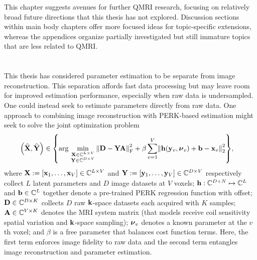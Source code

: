 
This chapter suggests avenues
for further QMRI research,
focusing on relatively broad future directions
that this thesis has not explored.
Discussion sections
within main body chapters
offer more focused ideas 
for topic-specific extensions,
whereas the appendices organize 
partially investigated but still immature topics
that are less related to QMRI.

\section{%
}%
\label{s,future,recon}

This thesis has considered parameter estimation
to be separate from image reconstruction.
This separation affords fast data processing
but may leave room for improved estimation performance,
especially when raw data is undersampled.
One could instead seek 
to estimate parameters 
directly from raw data.
One approach 
to combining image reconstruction
with PERK-based estimation
might seek to solve
the joint optimization problem
\begin{align}
	\paren{\est{\bmX},\est{\bmY}} &\in \set{%
		\argmin{%
			\substack{%
				\bmX \in \complexes{L \times V} \\
				\bmY \in \complexes{D \times V} \\
			}%
		}%
		\frob{\bmD-\bmY\bmA}^2 
			+ \beta \sum_{v=1}^V 
				\norm{\bmh\paren{\bmy_v,\bmnu_v}+\bmb-\bmx_v}^2_2
	},
	\label{eq:future,recon}
\end{align}
where 
$\bmX := \brac{\bmx_1,\dots,\bmx_V} \in \complexes{L \times V}$
and
$\bmY := \brac{\bmy_1,\dots,\bmy_V} \in \complexes{D \times V}$
respectively collect $L$ latent parameters 
and $D$ image datasets 
at $V$ voxels;
$\mathbf{h} : \mathbb{C}^{D+N} \mapsto \mathbb{C}^{L}$ 
and $\mathbf{b} \in \mathbb{C}^{L}$ 
together denote a pre-trained PERK regression function with offset;
$\mathbf{D} \in \mathbb{C}^{D \times K}$
collects $D$ raw $\mathbf{k}$-space datasets 
each acquired with $K$ samples;
$\mathbf{A} \in \mathbb{C}^{V \times K}$ 
denotes the MRI system matrix
(that models receive coil sensitivity spatial variation 
and $\mathbf{k}$-space sampling);
$\boldsymbol{\nu}_v$ denotes a known parameter at the $v$th voxel;
and $\beta$ is a free parameter
that balances cost function terms.
Here, 
the first term enforces 
image fidelity to raw data
and the second term entangles 
image reconstruction and parameter estimation.

